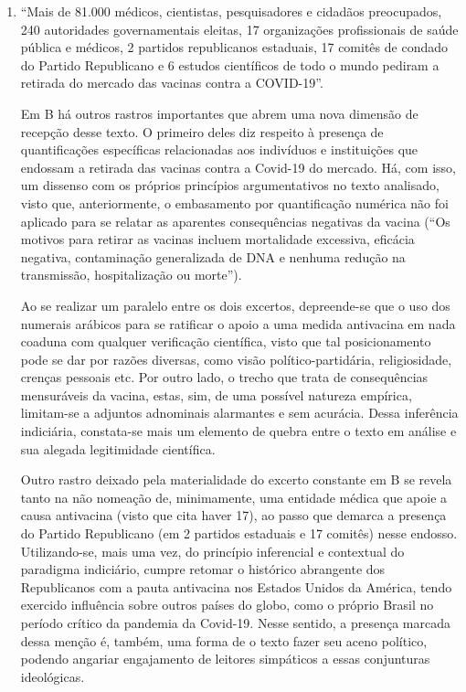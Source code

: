 \documentclass[portuguese]{textolivre}
\begin{document}
\begin{enumerate}
\begin{enumerate}
\item “Mais de 81.000 médicos, cientistas, pesquisadores e cidadãos preocupados, 240 autoridades governamentais eleitas, 17 organizações profissionais de saúde pública e médicos, 2 partidos republicanos estaduais, 17 comitês de condado do Partido Republicano e 6 estudos científicos de todo o mundo pediram a retirada do mercado das vacinas contra a COVID-19”.

Em B há outros rastros importantes que abrem uma nova dimensão de recepção desse texto. O primeiro deles diz respeito à presença de quantificações específicas relacionadas aos indivíduos e instituições que endossam a retirada das vacinas contra a Covid-19 do mercado. Há, com isso, um dissenso com os próprios princípios argumentativos no texto analisado, visto que, anteriormente, o embasamento por quantificação numérica não foi aplicado para se relatar as aparentes consequências negativas da vacina (“Os motivos para retirar as vacinas incluem mortalidade excessiva, eficácia negativa, contaminação generalizada de DNA e nenhuma redução na transmissão, hospitalização ou morte”).

Ao se realizar um paralelo entre os dois excertos, depreende-se que o uso dos numerais arábicos para se ratificar o apoio a uma medida antivacina em nada coaduna com qualquer verificação científica, visto que tal posicionamento pode se dar por razões diversas, como visão político-partidária, religiosidade, crenças pessoais etc. Por outro lado, o trecho que trata de consequências mensuráveis da vacina, estas, sim, de uma possível natureza empírica, limitam-se a adjuntos adnominais alarmantes e sem acurácia. Dessa inferência indiciária, constata-se mais um elemento de quebra entre o texto em análise e sua alegada legitimidade científica.

Outro rastro deixado pela materialidade do excerto constante em B se revela tanto na não nomeação de, minimamente, uma entidade médica que apoie a causa antivacina (visto que cita haver 17), ao passo que demarca a presença do Partido Republicano (em 2 partidos estaduais e 17 comitês) nesse endosso. Utilizando-se, mais uma vez, do princípio inferencial e contextual do paradigma indiciário, cumpre retomar o histórico abrangente dos Republicanos com a pauta antivacina nos Estados Unidos da América, tendo exercido influência sobre outros países do globo, como o próprio Brasil no período crítico da pandemia da Covid-19. Nesse sentido, a presença marcada dessa menção é, também, uma forma de o texto fazer seu aceno político, podendo angariar engajamento de leitores simpáticos a essas conjunturas ideológicas.
\end{enumerate}

\end{enumerate}
\end{document}

